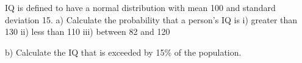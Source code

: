 





IQ  is defined to have a normal distribution with mean 100 and standard deviation 15. 
	a) Calculate the probability that a person’s IQ is
	i) greater than 130
	ii) less than 110
	iii) between 82 and 120
	
	b) Calculate the IQ that is exceeded by 15\% of the population.

